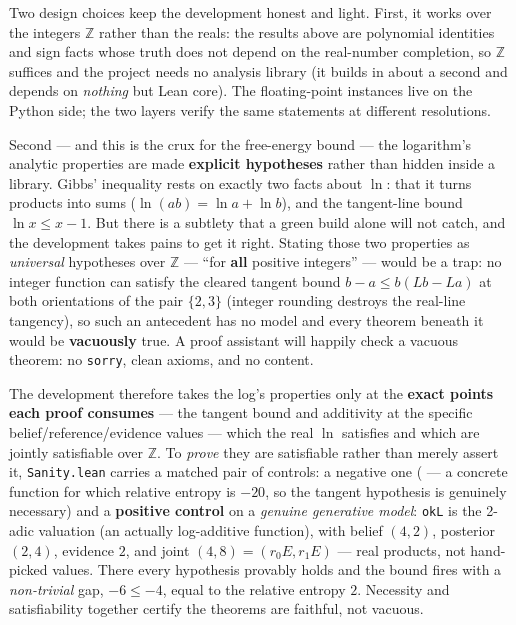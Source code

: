 \documentclass[
  english,
]{article}
\begin{document}
Two design choices keep the development honest and light. First, it
works over the integers \(\mathbb{Z}\) rather than the reals: the
results above are polynomial identities and sign facts whose truth does
not depend on the real-number completion, so \(\mathbb{Z}\) suffices and
the project needs no analysis library (it builds in about a second and
depends on \emph{nothing} but Lean core). The floating-point instances
live on the Python side; the two layers verify the same statements at
different resolutions.

Second --- and this is the crux for the free-energy bound --- the
logarithm's analytic properties are made \textbf{explicit hypotheses}
rather than hidden inside a library. Gibbs' inequality rests on exactly
two facts about \(\ln\): that it turns products into sums
(\(\ln(ab)=\ln a+\ln b\)), and the tangent-line bound \(\ln x \le x-1\).
But there is a subtlety that a green build alone will not catch, and the
development takes pains to get it right. Stating those two properties as
\emph{universal} hypotheses over \(\mathbb{Z}\) --- ``for \textbf{all}
positive integers'' --- would be a trap: no integer function can satisfy
the cleared tangent bound \(b-a \le b(L b - L a)\) at both orientations
of the pair \(\{2,3\}\) (integer rounding destroys the real-line
tangency), so such an antecedent has no model and every theorem beneath
it would be \textbf{vacuously} true. A proof assistant will happily
check a vacuous theorem: no \texttt{sorry}, clean axioms, and no
content.

The development therefore takes the log's properties only at the
\textbf{exact points each proof consumes} --- the tangent bound and
additivity at the specific belief/reference/evidence values --- which
the real \(\ln\) satisfies and which are jointly satisfiable over
\(\mathbb{Z}\). To \emph{prove} they are satisfiable rather than merely
assert it, \texttt{Sanity.lean} carries a matched pair of controls: a
negative one ( --- a concrete
function for which relative entropy is \(-20\), so the tangent
hypothesis is genuinely necessary) and a \textbf{positive control} on a
\emph{genuine generative model}: \texttt{okL} is the 2-adic valuation
(an actually log-additive function), with belief \((4,2)\), posterior
\((2,4)\), evidence \(2\), and joint \((4,8) = (r_0 E, r_1 E)\) --- real
products, not hand-picked values. There every hypothesis provably holds
and the bound fires with a \emph{non-trivial} gap, \(-6 \le -4\), equal
to the relative entropy \(2\). Necessity and satisfiability together
certify the theorems are faithful, not vacuous.
\end{document}
